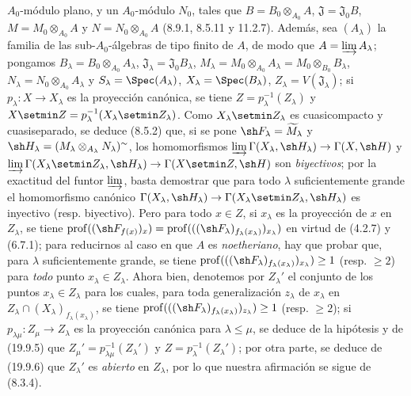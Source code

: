 $A_0$-módulo plano, y un $A_0$-módulo $N_0$, tales que
$B=B_0\otimes_{A_0}A$, $\mathfrak J=\mathfrak J_0B$,
$M=M_0\otimes_{A_0}A$ y $N=N_0\otimes_{A_0}A$ (8.9.1, 8.5.11 y 11.2.7).
Además, sea $(A_\lambda)$ la familia de las sub-$A_0$-álgebras de tipo finito
de $A$, de modo que $A=\varinjlim A_\lambda$; pongamos
$B_\lambda=B_0\otimes_{A_0}A_\lambda$, $\mathfrak J_\lambda=\mathfrak J_0B_\lambda$, $M_\lambda=M_0\otimes_{A_0}A_\lambda=M_0\otimes_{B_0}B_\lambda$, $N_\lambda=N_0\otimes_{A_0}A_\lambda$ y $S_\lambda=\Spec(A_\lambda)$, $X_\lambda=\Spec(B_\lambda)$, $Z_\lambda=V(\mathfrak J_\lambda)$;
si $p_\lambda:X\to X_\lambda$ es la proyección canónica, se tiene
$Z=p_\lambda^{-1}(Z_\lambda)$ y
$X\setmin Z=p_\lambda^{-1}(X_\lambda\setmin Z_\lambda)$. Como
$X_\lambda\setmin Z_\lambda$ es cuasicompacto y cuasiseparado, se deduce (8.5.2)
que, si se pone $\sh F_\lambda=\widetilde{M}_\lambda$ y
$\sh H_\lambda=(M_\lambda\otimes_{A_\lambda}N_\lambda)^\sim$, los
homomorfismos
$\varinjlim\Gamma(X_\lambda,\sh H_\lambda)\to\Gamma(X,\sh H)$ y $\varinjlim\Gamma(X_\lambda\setmin Z_\lambda,\sh H_\lambda)\to\Gamma(X\setmin Z,\sh H)$
son \emph{biyectivos}; por la exactitud del funtor $\varinjlim$, basta demostrar que
para todo $\lambda$ suficientemente grande el homomorfismo canónico
$\Gamma(X_\lambda,\sh H_\lambda)\to\Gamma(X_\lambda\setmin Z_\lambda,\sh H_\lambda)$ es inyectivo (resp. biyectivo).
Pero para todo $x\in Z$, si $x_\lambda$ es la proyección de $x$ en
$Z_\lambda$, se tiene
$\operatorname{prof}((\sh F_{f(x)})_x)=\operatorname{prof}(((\sh F_\lambda)_{f_\lambda(x_\lambda)})_{x_\lambda})$
en virtud de (4.2.7) y (6.7.1); para reducirnos al caso en que $A$ es
\emph{noetheriano}, hay que probar que, para $\lambda$ suficientemente grande, se
tiene
$\operatorname{prof}(((\sh F_\lambda)_{f_\lambda(x_\lambda)})_{x_\lambda})\geq1$ (resp. $\geq2$) para \emph{todo} punto $x_\lambda\in Z_\lambda$. Ahora bien,
denotemos por $Z_\lambda'$ el conjunto de los puntos $x_\lambda\in Z_\lambda$
para los cuales, para toda generalización $z_\lambda$ de $x_\lambda$ en
$Z_\lambda\cap(X_\lambda)_{f_\lambda(x_\lambda)}$, se tiene
$\operatorname{prof}(((\sh F_\lambda)_{f_\lambda(x_\lambda)})_{z_\lambda})\geq1$ (resp. $\geq2$); si $p_{\lambda\mu}:Z_\mu\to Z_\lambda$ es la proyección canónica
para $\lambda\leq\mu$, se deduce de la hipótesis y de (19.9.5) que
$Z_\mu'=p_{\lambda\mu}^{-1}(Z_\lambda')$ y
$Z=p_\lambda^{-1}(Z_\lambda')$; por otra parte, se deduce de (19.9.6) que
$Z_\lambda'$ es \emph{abierto} en $Z_\lambda$, por lo que nuestra afirmación se sigue
de (8.3.4).


